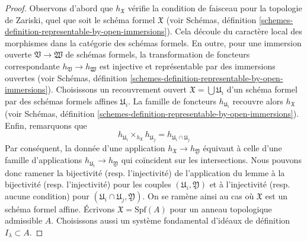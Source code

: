 \begin{proof}
Observons d'abord que $h_\mathfrak X$ vérifie la condition de faisceau pour
la topologie de Zariski, quel que soit le schéma formel $\mathfrak X$ (voir
Schémas, définition \ref{schemes-definition-representable-by-open-immersions}).
Cela découle du caractère local des morphismes dans la catégorie
des schémas formels. En outre, pour une immersion ouverte
$\mathfrak V \to \mathfrak W$ de schémas formels,
la transformation de foncteurs correspondante $h_\mathfrak V \to h_\mathfrak W$
est injective et représentable par des immersions ouvertes (voir
Schémas, définition \ref{schemes-definition-representable-by-open-immersions}).
Choisissons un recouvrement ouvert $\mathfrak X = \bigcup \mathfrak U_i$
d'un schéma formel par des schémas formels affines $\mathfrak U_i$.
La famille de foncteurs
$h_{\mathfrak U_i}$ recouvre alors $h_\mathfrak X$ (voir
Schémas, définition \ref{schemes-definition-representable-by-open-immersions}).
Enfin, remarquons que
$$
h_{\mathfrak U_i} \times_{h_\mathfrak X} h_{\mathfrak U_j} =
h_{\mathfrak U_i \cap \mathfrak U_j}
$$
Par conséquent, la donnée d'une application $h_\mathfrak X \to h_\mathfrak Y$
équivaut à celle d'une famille d'applications
$h_{\mathfrak U_i} \to h_\mathfrak Y$ qui coïncident sur les intersections.
Nous pouvons donc ramener la bijectivité (resp. l'injectivité) de l'application
du lemme à la bijectivité (resp. l'injectivité) pour les couples
$(\mathfrak U_i, \mathfrak Y)$
et à l'injectivité (resp. aucune condition)
pour $(\mathfrak U_i \cap \mathfrak U_j, \mathfrak Y)$.
On se ramène ainsi au cas où $\mathfrak X$ est un
schéma formel affine. Écrivons $\mathfrak X = \text{Spf}(A)$
pour un anneau topologique admissible $A$. Choisissons aussi un
système fondamental d'idéaux de définition $I_\lambda \subset A$.


\end{proof}
